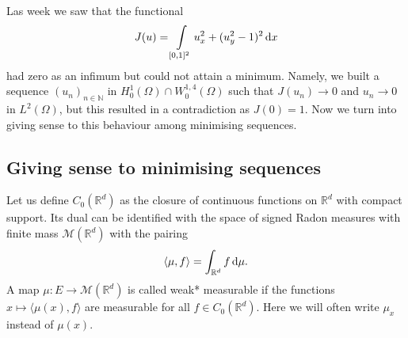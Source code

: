 \documentclass[a4paper,doc,11pt]{article}
\newcommand{\R}{\mathbb{R}}
\newcommand{\N}{\mathbb{N}}
\begin{document}
Las week we saw that the functional 
\[
    J(u) = \int\limits_{[0,1]^2} u_x^2 + (u_y^2-1)^2 \dif x
\]
had zero as an infimum but could not attain a minimum. Namely, we built a sequence \((u_n)_{n\in \N}\) in \(H_0^1 (\Omega) \cap W_0^{1,4} (\Omega)\) such that \( J(u_n) \to 0\) and \(u_n \to 0\) in \(L^2(\Omega)\), but this resulted in a contradiction as \(J(0) = 1\). Now we turn into giving sense to this behaviour among minimising sequences.

\subsection{Giving sense to minimising sequences}

Let us define \(C_0(\R^d)\) as the closure of continuous functions on \(\R^d\) with compact support. Its dual can be identified with the space of signed Radon measures with finite mass \(\mathcal{M}(\R^d)\) with the pairing
\[
    \langle \mu,f \rangle = \int_{\R^d} f \dif \mu.
\]
A map \(\mu : E \to \mathcal{M}(\R^d)\) is called weak* measurable if the functions \(x \mapsto \langle \mu(x), f\rangle\) are measurable for all \(f\in C_0 (\R^d)\). Here we will often write \(\mu_x\) instead of \(\mu(x)\).
\end{document}
